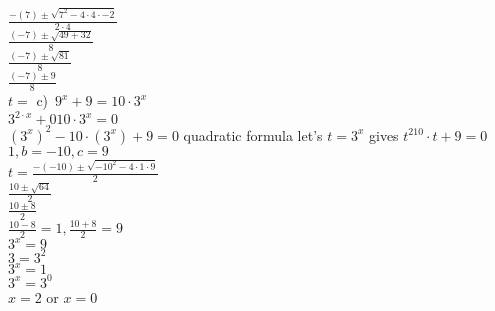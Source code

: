 \documentclass{article}
\begin{document}
  $\frac{-(7)\pm\sqrt{7^2-4\cdot4\cdot-2}}{2\cdot4}$\\
  $\frac{(-7)\pm\sqrt{49+32}}{8}$\\
  $\frac{(-7)\pm\sqrt{81}}{8}$\\
  $\frac{(-7)\pm9}{8}$\\
  $t=$
  c) $9^x+9=10\cdot 3^x$\\
  $3^{2\cdot x}+010\cdot 3^x=0$\\
  $(3^x)^2-10\cdot(3^x)+9=0$ quadratic formula let's $t=3^x$ gives $t^210\cdot t+9=0$\\
  $1,b=-10,c=9$\\
  $t=\frac{-(-10)\pm\sqrt{-10^2-4\cdot 1\cdot 9}}{2}$\\
  $\frac{10\pm\sqrt{64}}{2}$\\
  $\frac{10\pm8}{2}$\\
  $\frac{10-8}{2}=1, \frac{10+8}{2}=9$\\
  $3^x=9$\\
  $3=3^2$\\
  $3^x=1$\\
  $3^x=3^0$\\
  $x=2$ or $x=0$\\
   

   
\end{document}

